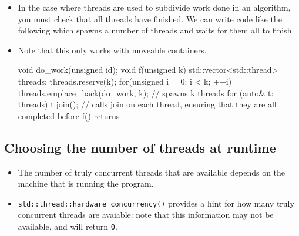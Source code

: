 \documentclass[11pt, a4paper]{article}
\theoremstyle{definition}
\theoremstyle{remark}
\newcommand{\code}[1]{\lstinline|#1|}
\begin{document}
\begin{itemize}
\begin{cppcode}
class joining_thread {
    std::thread t;
public:
    joining_thread() noexcept = default;

    template<typename Callable, typename... Args>
    requires std::invocable<Callable, Args...>
    explicit joining_thread(Callable&& func, Args&&... args) :
        t(std::forward<Callable>(func), std::forward<Args>(args)...) {}

    ~joining_thread() {
        if (joinable()) join();
    }

    joining_thread(const joining_thread&) = delete;
    joining_thread& operator=(const joining_thread&) = delete;

    joining_thread(joining_thread&& other) noexcept :
        t(std::move(other.t)) {}

    joining_thread& operator=(joining_thread&& other) noexcept {
        if (joinable()) join();
        t = std::move(other.t);
        return *this;
    }
};
\end{cppcode}
    \item In the case where threads are used to subdivide work done in an algorithm, you must check that all threads have finished. We can write code like the following which spawns a number of threads and waits for them all to finish.
    \item Note that this only works with moveable containers.
\begin{cppcode}
void do_work(unsigned id);
void f(unsigned k) {
    std::vector<std::thread> threads;
    threads.reserve(k);
    for(unsigned i = 0; i < k; ++i) {
        threads.emplace_back(do_work, k); // spawns k threads
    }
    for (auto& t: threads) {
        t.join(); // calls join on each thread, ensuring that they are all completed before f() returns
    }
}
\end{cppcode}
\end{itemize}
\subsection{Choosing the number of threads at runtime}
\begin{itemize}
    \item The number of truly concurrent threads that are available depends on the machine that is running the program.
    \item \code{std::thread::hardware_concurrency()} provides a hint for how many truly concurrent threads are avaiable: note that this information may not be available, and will return \code{0}.
\end{itemize}
\end{document}
